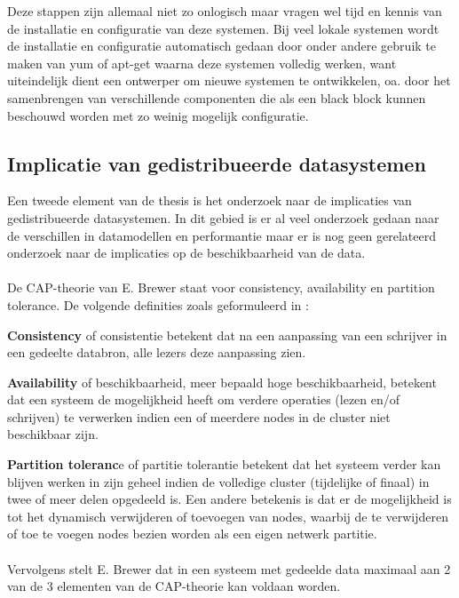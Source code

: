 Deze stappen zijn allemaal niet zo onlogisch maar vragen wel tijd en kennis van de installatie en configuratie van deze systemen. Bij veel lokale systemen wordt de installatie en configuratie automatisch gedaan door onder andere gebruik te maken van \gls{yum} of \gls{apt-get} waarna deze systemen volledig werken, want uiteindelijk dient een ontwerper om nieuwe systemen te ontwikkelen, oa. door het samenbrengen van verschillende componenten die als een black block kunnen beschouwd worden met zo weinig mogelijk configuratie. 

\subsection{Implicatie van gedistribueerde datasystemen}
Een tweede element van de thesis is het onderzoek naar de implicaties van gedistribueerde datasystemen. In dit gebied is er al veel onderzoek gedaan naar de verschillen in datamodellen en performantie maar er is nog geen gerelateerd onderzoek naar de implicaties op de beschikbaarheid van de data. 

\paragraph{}De CAP-theorie van E. Brewer\cite{Brewer:2000:TRD:343477.343502} staat voor consistency, availability en partition tolerance. De volgende definities zoals geformuleerd in \cite{Strauch.NoSQL}:


\textbf{Consistency} of consistentie betekent dat na een aanpassing van een schrijver in een gedeelte databron, alle lezers deze aanpassing zien. 

\textbf{Availability} of beschikbaarheid, meer bepaald hoge beschikbaarheid, betekent dat een systeem de mogelijkheid heeft om verdere operaties (lezen en/of schrijven) te verwerken indien een of meerdere nodes in de cluster niet beschikbaar zijn.

\textbf{Partition toleranc}e of partitie tolerantie betekent dat het systeem verder kan blijven werken in zijn geheel indien de volledige cluster (tijdelijke of finaal) in twee of meer delen opgedeeld is. Een andere betekenis is dat er de mogelijkheid is tot het dynamisch verwijderen of toevoegen van nodes, waarbij de te verwijderen of toe te voegen nodes bezien worden als een eigen netwerk partitie. 

\paragraph{} Vervolgens stelt E. Brewer dat in een systeem met gedeelde data maximaal aan 2 van de 3 elementen van de CAP-theorie kan voldaan worden. 

